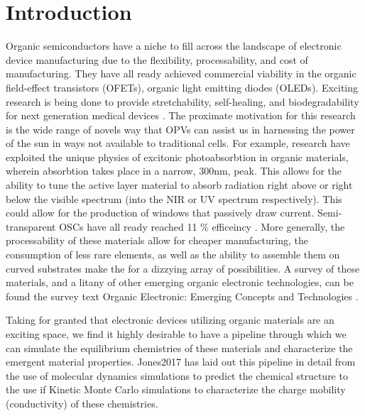\chapter{Introduction} 
Organic semiconductors have a niche to fill across the landscape of electronic
device manufacturing due to the flexibility, processability, and cost of manufacturing. They have all ready
achieved commercial viability in the organic field-effect transistors (OFETs), organic light emitting
diodes (OLEDs). Exciting research is being done to provide stretchability, self-healing, and biodegradability for next generation medical devices \cite{Brutting2006}.
The proximate motivation for this research is the wide range of novels way that OPVs
can assist us in harnessing the power of the sun in ways not available to traditional cells. 
For example, research have exploited the unique physics of excitonic photoabsorbtion in organic materials, wherein absorbtion takes place in a narrow, 300nm, peak.
This allows for the ability to tune the active layer material to absorb radiation right above or right below the
visible spectrum (into the NIR or UV spectrum respectively). This 
could allow for the production of windows that passively draw current. Semi-transparent OSCs have all ready
reached 11 \% efficeincy \cite{Brabec2020}. More generally, the processability of these materials allow for
cheaper manufacturing, the consumption of less rare elements, as well as the ability to assemble them on curved substrates make the for a dizzying array of possibilities. A survey of these materials, and a litany of
other emerging organic electronic technologies, can be found the survey text 
Organic Electronic: Emerging Concepts and Technologies
\cite{FabioCicoiraEditor2013}. 

Taking for granted that electronic devices utilizing organic materials are an exciting
space, we find it highly desirable to have a pipeline through which we can simulate the equilibrium
chemistries of these materials and characterize the emergent material properties. Jones2017 has laid out this
pipeline in detail from the use of molecular dynamics simulations to predict the chemical structure to the use
if Kinetic Monte Carlo simulations to characterize the charge mobility (conductivity) of these chemistries.

